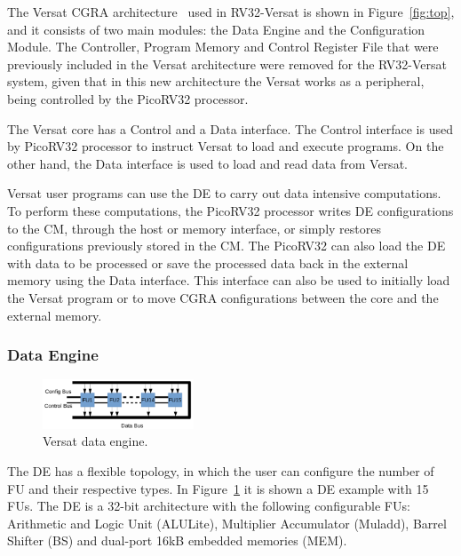 \documentclass[conference]{IEEEtran}
\begin{document}
The Versat CGRA architecture~\cite{sousa:versat, sousa:versat2016,
	sousa:controller, sousa:compiler, versat:specification} used in RV32-Versat is
shown in Figure~\ref{fig:top}, and it consists of two main modules: the Data
Engine and the Configuration Module. The Controller, Program Memory and Control
Register File that were previously included in the Versat architecture were
removed for the RV32-Versat system, given that in this new architecture the
Versat works as a peripheral, being controlled by the PicoRV32 processor.

The Versat core has a Control and a Data interface. The Control interface is
used by PicoRV32 processor to instruct Versat to load and execute programs. On
the other hand, the Data interface is used to load and read data from Versat.

Versat user programs can use the \ac{DE} to carry out data intensive computations. To
perform these computations, the PicoRV32 processor writes \ac{DE} configurations to
the \ac{CM}, through the host or memory interface, or simply restores
configurations previously stored in the \ac{CM}. The PicoRV32 can also load the
\ac{DE} with data to be processed or save the processed data back in the
external memory using the Data interface. This interface can also be used to
initially load the Versat program or to move \ac{CGRA} configurations between
the core and the external memory.


\subsubsection{Data Engine}
\label{subsection:data}

\begin{figure}[!htb]
	\centering
	\includegraphics[width=0.4\textwidth]{Figures/de.png}
	\caption{Versat data engine.}
	\label{fig:de}
\end{figure}

The \ac{DE} has a flexible topology, in which the user can configure the number
of \ac{FU} and their respective types. In Figure~\ref{fig:de} it is shown a
\ac{DE} example with 15 \ac{FU}s. The \ac{DE} is a 32-bit architecture with the
following configurable \ac{FU}s: Arithmetic and Logic Unit (ALULite),
Multiplier Accumulator (Muladd), Barrel Shifter (BS) and dual-port 16kB embedded
memories (MEM).
\end{document}
